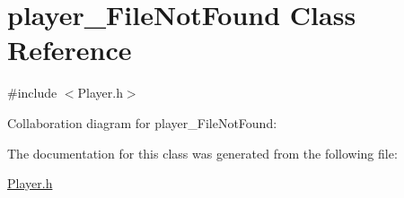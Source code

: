 \hypertarget{classplayer___file_not_found}{}\section{player\+\_\+\+File\+Not\+Found Class Reference}
\label{classplayer___file_not_found}


{\ttfamily \#include $<$Player.\+h$>$}



Collaboration diagram for player\+\_\+\+File\+Not\+Found\+:


The documentation for this class was generated from the following file\+:\begin{DoxyCompactItemize}
\item 
\hyperlink{_player_8h}{Player.\+h}\end{DoxyCompactItemize}
